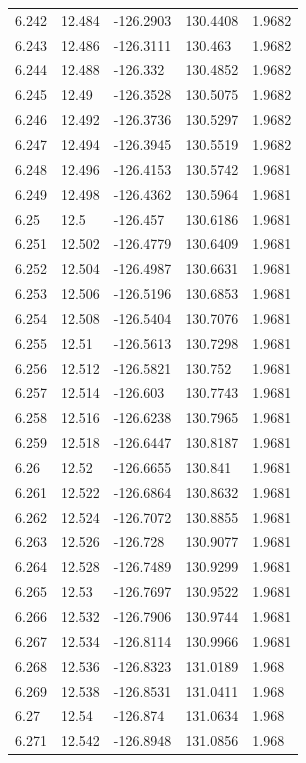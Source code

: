 \begin{tabular}{lllll}
6.242 & 12.484 & -126.2903 & 130.4408 & 1.9682 \\
6.243 & 12.486 & -126.3111 & 130.463 & 1.9682 \\
6.244 & 12.488 & -126.332 & 130.4852 & 1.9682 \\
6.245 & 12.49 & -126.3528 & 130.5075 & 1.9682 \\
6.246 & 12.492 & -126.3736 & 130.5297 & 1.9682 \\
6.247 & 12.494 & -126.3945 & 130.5519 & 1.9682 \\
6.248 & 12.496 & -126.4153 & 130.5742 & 1.9681 \\
6.249 & 12.498 & -126.4362 & 130.5964 & 1.9681 \\
6.25 & 12.5 & -126.457 & 130.6186 & 1.9681 \\
6.251 & 12.502 & -126.4779 & 130.6409 & 1.9681 \\
6.252 & 12.504 & -126.4987 & 130.6631 & 1.9681 \\
6.253 & 12.506 & -126.5196 & 130.6853 & 1.9681 \\
6.254 & 12.508 & -126.5404 & 130.7076 & 1.9681 \\
6.255 & 12.51 & -126.5613 & 130.7298 & 1.9681 \\
6.256 & 12.512 & -126.5821 & 130.752 & 1.9681 \\
6.257 & 12.514 & -126.603 & 130.7743 & 1.9681 \\
6.258 & 12.516 & -126.6238 & 130.7965 & 1.9681 \\
6.259 & 12.518 & -126.6447 & 130.8187 & 1.9681 \\
6.26 & 12.52 & -126.6655 & 130.841 & 1.9681 \\
6.261 & 12.522 & -126.6864 & 130.8632 & 1.9681 \\
6.262 & 12.524 & -126.7072 & 130.8855 & 1.9681 \\
6.263 & 12.526 & -126.728 & 130.9077 & 1.9681 \\
6.264 & 12.528 & -126.7489 & 130.9299 & 1.9681 \\
6.265 & 12.53 & -126.7697 & 130.9522 & 1.9681 \\
6.266 & 12.532 & -126.7906 & 130.9744 & 1.9681 \\
6.267 & 12.534 & -126.8114 & 130.9966 & 1.9681 \\
6.268 & 12.536 & -126.8323 & 131.0189 & 1.968 \\
6.269 & 12.538 & -126.8531 & 131.0411 & 1.968 \\
6.27 & 12.54 & -126.874 & 131.0634 & 1.968 \\
6.271 & 12.542 & -126.8948 & 131.0856 & 1.968 \\

\end{tabular}
